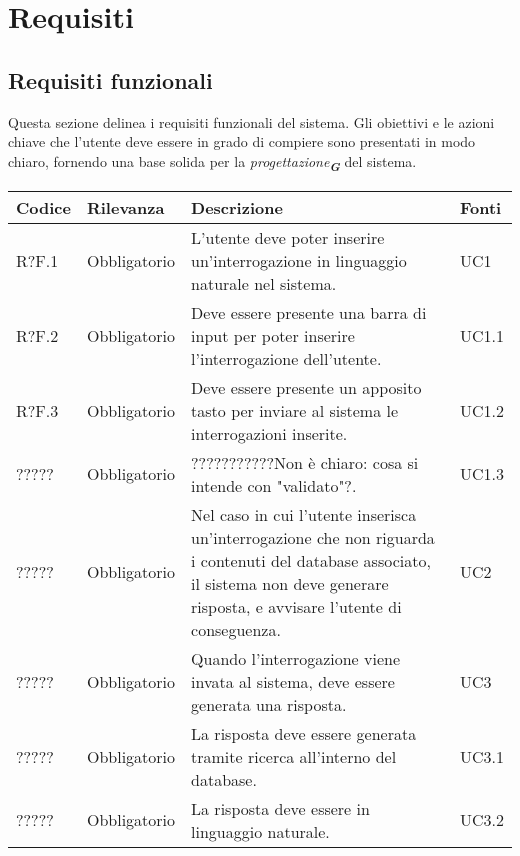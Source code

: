 

\section{Requisiti}
\label{sec:Requisiti}   

\subsection{Requisiti funzionali}
Questa sezione delinea i requisiti funzionali del sistema. Gli obiettivi e le azioni chiave che
l'utente deve essere in grado di compiere sono presentati in modo chiaro, fornendo una base
solida per la \emph{progettazione}\textsubscript{\textit{\textbf{G}}} del sistema.
\begin{table}[h!]
    \centering
    \renewcommand{\arraystretch}{1.6} %
    \begin{tabularx}{\textwidth}{|p{2cm}|p{3cm}|X|p{4cm}|} \hline
    \rowcolor[HTML]{FFD700} 
    \textbf{Codice} & \textbf{Rilevanza} & \textbf{Descrizione} & \textbf{Fonti} \\ \hline
    R?F.1 & Obbligatorio & L'utente deve poter inserire un'interrogazione in linguaggio naturale nel sistema. & UC1 \\ \hline
    R?F.2 & Obbligatorio & Deve essere presente una barra di input per poter inserire l'interrogazione dell'utente. & UC1.1 \\ \hline
    R?F.3 & Obbligatorio & Deve essere presente un apposito tasto per inviare al sistema le interrogazioni inserite. & UC1.2 \\ \hline
    ????? & Obbligatorio & ???????????Non è chiaro: cosa si intende con "validato"?. & UC1.3 \\ \hline
    ????? & Obbligatorio & Nel caso in cui l'utente inserisca un'interrogazione che non riguarda i contenuti del database associato, il sistema non deve generare risposta, e avvisare l'utente di conseguenza. & UC2 \\ \hline
    ????? & Obbligatorio & Quando l'interrogazione viene invata al sistema, deve essere generata una risposta. & UC3 \\ \hline
    ????? & Obbligatorio & La risposta deve essere generata tramite ricerca all'interno del database. & UC3.1 \\ \hline
    ????? & Obbligatorio & La risposta deve essere in linguaggio naturale. & UC3.2 \\ \hline

\end{tabularx}
\end{table}
